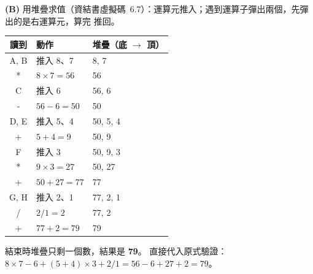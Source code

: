 \begin{pastsoln}
\textbf{(B)} 用堆疊求值（資結書虛擬碼~6.7）：運算元推入；遇到運算子彈出兩個，先彈出的是右運算元，算完
推回。
\begin{center}
\small
\begin{tabular}{cll}
\toprule
讀到 & 動作 & 堆疊（底 $\to$ 頂） \\
\midrule
A, B & 推入 8、7 & 8, 7 \\
* & $8 \times 7 = 56$ & 56 \\
C & 推入 6 & 56, 6 \\
- & $56 - 6 = 50$ & 50 \\
D, E & 推入 5、4 & 50, 5, 4 \\
+ & $5 + 4 = 9$ & 50, 9 \\
F & 推入 3 & 50, 9, 3 \\
* & $9 \times 3 = 27$ & 50, 27 \\
+ & $50 + 27 = 77$ & 77 \\
G, H & 推入 2、1 & 77, 2, 1 \\
/ & $2 / 1 = 2$ & 77, 2 \\
+ & $77 + 2 = 79$ & 79 \\
\bottomrule
\end{tabular}
\end{center}
結束時堆疊只剩一個數，結果是 \textbf{79}。 直接代入原式驗證：$8 \times 7 - 6 + (5 + 4) \times 3 + 2 / 1
= 56 - 6 + 27 + 2 = 79$。
\end{pastsoln}
